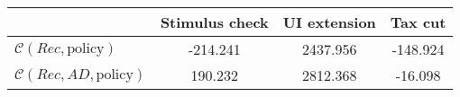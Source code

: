 \begin{tabular}{@{}lccc@{}} 
\toprule 
                          & Stimulus check      & UI extension    & Tax cut    \\  \midrule 
$\mathcal{C}(Rec,\text{policy})$ & -214.241  & 2437.956  & -148.924     \\ 
$\mathcal{C}(Rec, AD,\text{policy})$ & 190.232  & 2812.368  & -16.098     \\ 
\end{tabular}  
